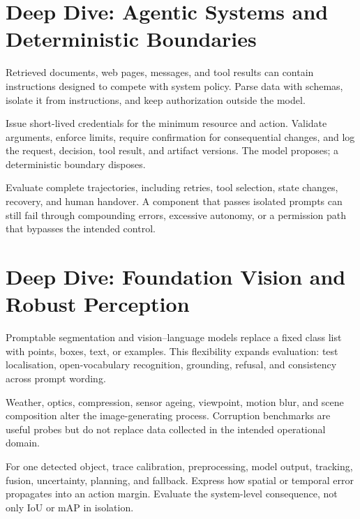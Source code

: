 \expandafter\def\csname almanachdeepdive@trustworthy-ai\endcsname{%
\section{Deep Dive: Agentic Systems and Deterministic Boundaries}
\begin{tcbitemize}[skin=sectionraster]
\tcbitem[title={Treat Tool Output as Untrusted},raster multicolumn=3]
Retrieved documents, web pages, messages, and tool results can contain
instructions designed to compete with system policy.
Parse data with schemas, isolate it from instructions, and keep authorization
outside the model.

\tcbitem[title={Least-Privilege Tool Use},raster multicolumn=3]
Issue short-lived credentials for the minimum resource and action.
Validate arguments, enforce limits, require confirmation for consequential
changes, and log the request, decision, tool result, and artifact versions.
The model proposes; a deterministic boundary disposes.

\tcbitem[title={Trajectory-Level Assurance},raster multicolumn=6]
Evaluate complete trajectories, including retries, tool selection, state
changes, recovery, and human handover.
A component that passes isolated prompts can still fail through compounding
errors, excessive autonomy, or a permission path that bypasses the intended
control.
\end{tcbitemize}
}

\expandafter\def\csname almanachdeepdive@computer-vision\endcsname{%
\section{Deep Dive: Foundation Vision and Robust Perception}
\begin{tcbitemize}[skin=sectionraster]
\tcbitem[title={Prompts Change the Vision Interface},raster multicolumn=3]
Promptable segmentation and vision--language models replace a fixed class list
with points, boxes, text, or examples.
This flexibility expands evaluation: test localisation, open-vocabulary
recognition, grounding, refusal, and consistency across prompt wording.

\tcbitem[title={Shift Is Often Physical},raster multicolumn=3]
Weather, optics, compression, sensor ageing, viewpoint, motion blur, and scene
composition alter the image-generating process.
Corruption benchmarks are useful probes but do not replace data collected in
the intended operational domain.

\tcbitem[title={Perception-to-Action Trace},raster multicolumn=6]
For one detected object, trace calibration, preprocessing, model output,
tracking, fusion, uncertainty, planning, and fallback.
Express how spatial or temporal error propagates into an action margin.
Evaluate the system-level consequence, not only IoU or mAP in isolation.
\end{tcbitemize}
}

